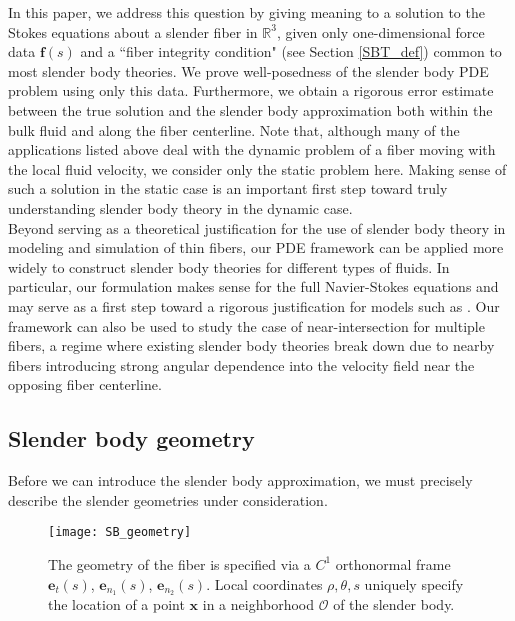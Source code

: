 \documentclass[11pt]{article}
\numberwithin{equation}{section}
\newcommand{\R}{\mathbb{R}}
\newcommand{\bx}{\bm{x}}
\newcommand{\be}{\bm{e}}
\theoremstyle{definition}
\begin{document}
In this paper, we address this question by giving meaning to a solution to the Stokes equations about a slender fiber in $\R^3$, given only one-dimensional force data $\bm{f}(s)$ and a ``fiber integrity condition" (see Section \ref{SBT_def}) common to most slender body theories. We prove well-posedness of the slender body PDE problem using only this data. Furthermore, we obtain a rigorous error estimate between the true solution and the slender body approximation both within the bulk fluid and along the fiber centerline. Note that, although many of the applications listed above deal with the dynamic problem of a fiber moving with the local fluid velocity, we consider only the static problem here. Making sense of such a solution in the static case is an important first step toward truly understanding slender body theory in the dynamic case. \\

Beyond serving as a theoretical justification for the use of slender body theory in modeling and simulation of thin fibers, our PDE framework can be applied more widely to construct slender body theories for different types of fluids. In particular, our formulation makes sense for the full Navier-Stokes equations and may serve as a first step toward a rigorous justification for models such as \cite{lim2008dynamics}. Our framework can also be used to study the case of near-intersection for multiple fibers, a regime where existing slender body theories break down due to nearby fibers introducing strong angular dependence into the velocity field near the opposing fiber centerline. 

\subsection{Slender body geometry}\label{geometric_constraints}
Before we can introduce the slender body approximation, we must precisely describe the slender geometries under consideration. \\

\begin{figure}[!h]
\centering
\texttt{[image: SB\_geometry]}\\
\caption{The geometry of the fiber is specified via a $C^1$ orthonormal frame $\be_t(s)$, $\be_{n_1}(s)$, $\be_{n_2}(s)$. Local coordinates $\rho,\theta,s$ uniquely specify the location of a point $\bx$ in a neighborhood $\mathcal{O}$ of the slender body.}
\label{fig:coord_sys}
\end{figure}
\end{document}
